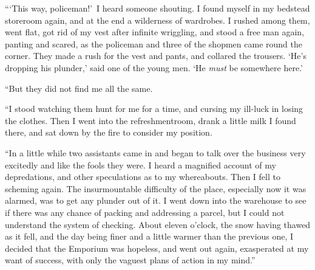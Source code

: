 “\kern1pt‘This way, policeman!’\ I heard someone shouting. I found myself in my bedstead storeroom again, and at the end a wilderness of wardrobes. I rushed among them, went flat, got rid of my vest after infinite wriggling, and stood a free man again, panting and scared, as the policeman and three of the shopmen came round the corner. They made a rush for the vest and pants, and collared the trousers. ‘He’s dropping his plunder,’ said one of the young men. ‘He \emph{must} be somewhere here.’

“But they did not find me all the same.

“I stood watching them hunt for me for a time, and cursing my ill-luck in losing the clothes. Then I went into the refreshmentroom, drank a little milk I found there, and sat down by the fire to consider my position.

“In a little while two assistants came in and began to talk over the business very excitedly and like the fools they were. I heard a magnified account of my depredations, and other speculations as to my whereabouts. Then I fell to scheming again. The insurmountable difficulty of the place, especially now it was alarmed, was to get any plunder out of it. I went down into the warehouse to see if there was any chance of packing and addressing a parcel, but I could not understand the system of checking. About eleven o’clock, the snow having thawed as it fell, and the day being finer and a little warmer than the previous one, I decided that the Emporium was hopeless, and went out again, exasperated at my want of success, with only the vaguest plans of action in my mind.”